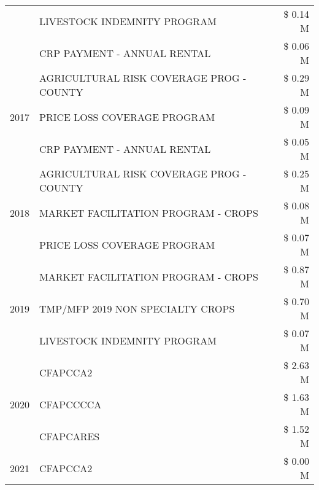 \begin{tabular}{llr}
 & LIVESTOCK INDEMNITY PROGRAM & \$ 0.14 M \\
 & CRP PAYMENT - ANNUAL RENTAL & \$ 0.06 M \\
\cline{1-3}
\multirow[t]{3}{*}{2017} & AGRICULTURAL RISK COVERAGE PROG - COUNTY & \$ 0.29 M \\
 & PRICE LOSS COVERAGE PROGRAM & \$ 0.09 M \\
 & CRP PAYMENT - ANNUAL RENTAL & \$ 0.05 M \\
\cline{1-3}
\multirow[t]{3}{*}{2018} & AGRICULTURAL RISK COVERAGE PROG - COUNTY & \$ 0.25 M \\
 & MARKET FACILITATION PROGRAM - CROPS & \$ 0.08 M \\
 & PRICE LOSS COVERAGE PROGRAM & \$ 0.07 M \\
\cline{1-3}
\multirow[t]{3}{*}{2019} & MARKET FACILITATION PROGRAM - CROPS & \$ 0.87 M \\
 & TMP/MFP 2019 NON SPECIALTY CROPS & \$ 0.70 M \\
 & LIVESTOCK INDEMNITY PROGRAM & \$ 0.07 M \\
\cline{1-3}
\multirow[t]{3}{*}{2020} & CFAPCCA2 & \$ 2.63 M \\
 & CFAPCCCCA & \$ 1.63 M \\
 & CFAPCARES & \$ 1.52 M \\
\cline{1-3}
2021 & CFAPCCA2 & \$ 0.00 M \\
\cline{1-3}
\bottomrule
\end{tabular}
